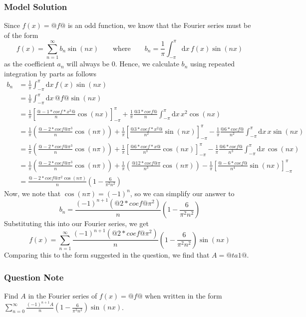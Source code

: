 \documentclass[a4paper,10pt]{article}
\begin{document}
\subsubsection{Model Solution}
Since \(f(x)=@f@\) is an odd function, we know that the Fourier series must be of the form \[ f(x) = \sum_{n=1}^{\infty}b_n\sin(nx) \qquad \text{where} \qquad b_n = \frac{1}{\pi}\int_{-\pi}^{\pi} \text{d}x \, f(x)\sin(nx) \] as the coefficient $a_n$ will always be $0$. Hence, we calculate \(b_n\) using repeated integration by parts as follows \begin{align*} b_n &= \frac{1}{\pi}\int_{-\pi}^{\pi} \text{d}x \, f(x)\sin(nx) \\ &= \frac{1}{\pi}\int_{-\pi}^{\pi} \text{d}x \, @f@\sin(nx) \\ &= \frac{1}{\pi} \left[ \frac{@-1*coef*x^3@}{n}\cos(nx) \right]_{-\pi}^{\pi} + \frac{1}{\pi}\frac{@3*coef@}{n}\int_{-\pi}^{\pi} \text{d}x \, x^2\cos(nx) \\ &= \frac{1}{\pi} \left(\frac{@-2*coef@\pi^3}{n}\cos(n \pi) \right) + \frac{1}{\pi} \left[ \frac{@3*coef*x^2@}{n^2}\sin(nx) \right]_{-\pi}^{\pi} - \frac{1}{\pi}\frac{@6*coef@}{n^2}\int_{-\pi}^{\pi} \text{d}x \, x\sin(nx) \\ &= \frac{1}{\pi} \left(\frac{@-2*coef@\pi^3}{n}\cos(n \pi) \right) + \frac{1}{\pi} \left[ \frac{@6*coef*x@}{n^3}\cos(nx) \right]_{-\pi}^{\pi} - \frac{1}{\pi}\frac{@6*coef@}{n^3}\int_{-\pi}^{\pi} \text{d}x \, \cos(nx) \\ &= \frac{1}{\pi} \left(\frac{@-2*coef@\pi^3}{n}\cos(n \pi) \right) + \frac{1}{\pi} \left(\frac{@12*coef@\pi}{n^3}\cos(n \pi) \right) - \frac{1}{\pi}\left[ \frac{@-6*coef@}{n^4}\sin(nx) \right]_{-\pi}^{\pi} \\ &= \frac{@-2*coef@\pi^2\cos(n\pi)}{n} \left( 1- \frac{6}{\pi^2n^2} \right) \end{align*}Now, we note that \(\cos(n\pi)=(-1)^n\), so we can simplify our answer to \[ b_n = \frac{(-1)^{n+1}(@2*coef@\pi^2)}{n} \left( 1- \frac{6}{\pi^2 n^2} \right) \] Substituting this into our Fourier series, we get \[ f(x) = \sum_{n=1}^{\infty}\frac{(-1)^{n+1}(@2*coef@\pi^2)}{n} \left( 1- \frac{6}{\pi^2n^2}\right)\sin(nx) \] Comparing this to the form suggested in the question, we find that \(A=@ta1@\).
\subsubsection{Question Note}
Find \(A\) in the Fourier series of \(f(x)=@f@\) when written in the form \(\sum_{n=0}^\infty \frac{(-1)^{n+1}A}{n}\left(1-\frac{6}{\pi^2n^2}\right)\sin(nx)\).
\end{document}
